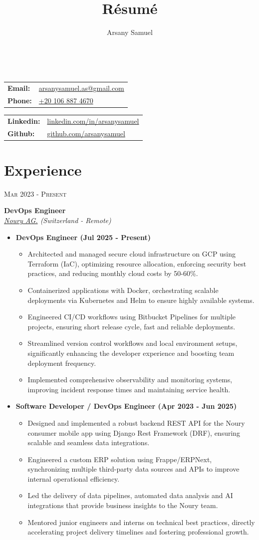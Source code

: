 \documentclass[a4paper]{article}
\title{R\'esum\'e}
\author{Arsany Samuel}
\makeatletter
\renewcommand{\maketitle}{
	\begin{center}
		{\Huge\bfseries{\theauthor}}\\
			\vspace{0.5em}
		{
			\begin{center}
                \begin{minipage}{0.4\linewidth}
                    \large\begin{tabular}{l  l}
                        \textbf{Email:} & \href{mailto:arsanysamuel.as@gmail.com}{arsanysamuel.as@gmail.com}  \\ 
                        \textbf{Phone:} & \href{tel:+201068874670}{+20 106 887 4670}  \\
                    \end{tabular}
                \end{minipage}
                \hspace{1em}
                \begin{minipage}{0.4\linewidth}
                    \large\begin{tabular}{l  l}
                        \textbf{Linkedin:} & \href{https://linkedin.com/in/arsanysamuel}{linkedin.com/in/arsanysamuel}  \\
                        \textbf{Github:} & \href{https://github.com/arsanysamuel}{github.com/arsanysamuel}
                    \end{tabular}
                \end{minipage}
			\end{center}
		}
	\end{center}
}
\newcommand{\entry}[4]{   %
	\begin{center}
		\begin{minipage}[c]{0.2\linewidth}  %
			\vfill
			\hfill  %
			\textsc{#1}  %
			\vfill
		\end{minipage}
		\hfill\vline\hfill  %
		\begin{minipage}[c]{0.75\linewidth}
            \textrm{\bfseries{#2}} \\
			\textit{#3} \\
			\footnotesize{#4}
		\end{minipage}
	\end{center}
}
\newcommand{\blist}[1]{  %
    \vspace{-\topsep}
    \renewcommand\labelitemi{\tiny$\bullet$}
    \begin{itemize}[leftmargin=3.5mm, noitemsep]
        #1
    \end{itemize}
}
\newcommand{\sblist}[1]{  %
    \vspace{-\topsep}
    \renewcommand\labelitemii{\textopenbullet}
    \begin{itemize}[leftmargin=5mm, noitemsep]
        #1
    \end{itemize}
}
\makeatother
\begin{document}
	\maketitle

	\section{Experience}
        \entry{Mar 2023 - Present}
            {DevOps Engineer}
            {\href{https://www.noury.ch/}{Noury AG.} (Switzerland - Remote)}
            {
                \blist{
                    \item \textbf{DevOps Engineer (Jul 2025 - Present)}
                    \sblist{
                        \item{Architected and managed secure cloud infrastructure on GCP using Terraform (IaC),
                            optimizing resource allocation, enforcing security best practices, and reducing monthly cloud costs by 50-60\%.}
                        \item{Containerized applications with Docker, orchestrating scalable deployments via Kubernetes and Helm to ensure highly available systems.}
                        \item{Engineered CI/CD workflows using Bitbucket Pipelines for multiple projects,
                            ensuring short release cycle, fast and reliable deployments.}
                        \item{Streamlined version control workflows and local environment setups,
                            significantly enhancing the developer experience and boosting team deployment frequency.}
                        \item{Implemented comprehensive observability and monitoring systems, improving incident response times and maintaining service health.}
                    }
                    \item \textbf{Software Developer / DevOps Engineer (Apr 2023 - Jun 2025)}
                    \sblist{

                        \item{Designed and implemented a robust backend REST API for the Noury consumer mobile app using Django Rest Framework (DRF),
                            ensuring scalable and seamless data integrations.}
                        \item{Engineered a custom ERP solution using Frappe/ERPNext,
                            synchronizing multiple third-party data sources and APIs to improve internal operational efficiency.}
                        \item{Led the delivery of data pipelines, automated data analysis and AI integrations that provide business insights to the Noury team.}
                        \item{Mentored junior engineers and interns on technical best practices,
                            directly accelerating project delivery timelines and fostering professional growth.}
                    }
                }
            }
\end{document}
